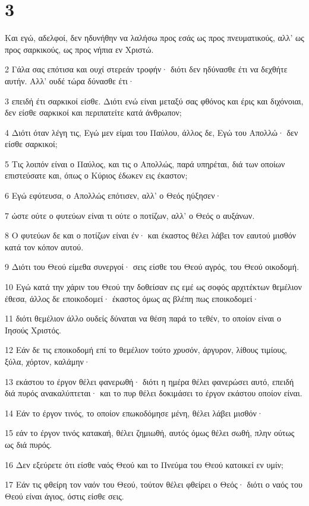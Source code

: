 \chapter{3}

\par Και εγώ, αδελφοί, δεν ηδυνήθην να λαλήσω προς εσάς ως προς πνευματικούς, αλλ' ως προς σαρκικούς, ως προς νήπια εν Χριστώ.
\par 2 Γάλα σας επότισα και ουχί στερεάν τροφήν· διότι δεν ηδύνασθε έτι να δεχθήτε αυτήν. Αλλ' ουδέ τώρα δύνασθε έτι·
\par 3 επειδή έτι σαρκικοί είσθε. Διότι ενώ είναι μεταξύ σας φθόνος και έρις και διχόνοιαι, δεν είσθε σαρκικοί και περιπατείτε κατά άνθρωπον;
\par 4 Διότι όταν λέγη τις, Εγώ μεν είμαι του Παύλου, άλλος δε, Εγώ του Απολλώ· δεν είσθε σαρκικοί;
\par 5 Τις λοιπόν είναι ο Παύλος, και τις ο Απολλώς, παρά υπηρέται, διά των οποίων επιστεύσατε και, όπως ο Κύριος έδωκεν εις έκαστον;
\par 6 Εγώ εφύτευσα, ο Απολλώς επότισεν, αλλ' ο Θεός ηύξησεν·
\par 7 ώστε ούτε ο φυτεύων είναι τι ούτε ο ποτίζων, αλλ' ο Θεός ο αυξάνων.
\par 8 Ο φυτεύων δε και ο ποτίζων είναι έν· και έκαστος θέλει λάβει τον εαυτού μισθόν κατά τον κόπον αυτού.
\par 9 Διότι του Θεού είμεθα συνεργοί· σεις είσθε του Θεού αγρός, του Θεού οικοδομή.
\par 10 Εγώ κατά την χάριν του Θεού την δοθείσαν εις εμέ ως σοφός αρχιτέκτων θεμέλιον έθεσα, άλλος δε εποικοδομεί· έκαστος όμως ας βλέπη πως εποικοδομεί·
\par 11 διότι θεμέλιον άλλο ουδείς δύναται να θέση παρά το τεθέν, το οποίον είναι ο Ιησούς Χριστός.
\par 12 Εάν δε τις εποικοδομή επί το θεμέλιον τούτο χρυσόν, άργυρον, λίθους τιμίους, ξύλα, χόρτον, καλάμην·
\par 13 εκάστου το έργον θέλει φανερωθή· διότι η ημέρα θέλει φανερώσει αυτό, επειδή διά πυρός ανακαλύπτεται· και το πυρ θέλει δοκιμάσει το έργον εκάστου οποίον είναι.
\par 14 Εάν το έργον τινός, το οποίον επωκοδόμησε μένη, θέλει λάβει μισθόν·
\par 15 εάν το έργον τινός κατακαή, θέλει ζημιωθή, αυτός όμως θέλει σωθή, πλην ούτως ως διά πυρός.
\par 16 Δεν εξεύρετε ότι είσθε ναός Θεού και το Πνεύμα του Θεού κατοικεί εν υμίν;
\par 17 Εάν τις φθείρη τον ναόν του Θεού, τούτον θέλει φθείρει ο Θεός· διότι ο ναός του Θεού είναι άγιος, όστις είσθε σεις.
